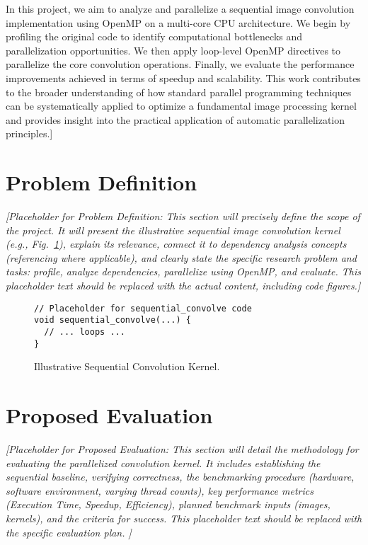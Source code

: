 \documentclass[conference, 10pt]{IEEEtran}
\begin{document}
{{In this project, we aim to analyze and parallelize a sequential image convolution implementation using OpenMP on a multi-core CPU architecture. We begin by profiling the original code to identify computational bottlenecks and parallelization opportunities. We then apply loop-level OpenMP directives to parallelize the core convolution operations. Finally, we evaluate the performance improvements achieved in terms of speedup and scalability. This work contributes to the broader understanding of how standard parallel programming techniques can be systematically applied to optimize a fundamental image processing kernel and provides insight into the practical application of automatic parallelization principles.]
}}

\section{Problem Definition}
\textit{{\color{blue} %
[Placeholder for Problem Definition: This section will precisely define the scope of the project. It will present the illustrative sequential image convolution kernel (e.g., Fig.~\ref{fig:seq_code}), explain its relevance, connect it to dependency analysis concepts (referencing \cite{idkfactchecking2025} where applicable), and clearly state the specific research problem and tasks: profile, analyze dependencies, parallelize using OpenMP, and evaluate. This placeholder text should be replaced with the actual content, including code figures.]
}}

\begin{figure}[htbp]
\begin{verbatim}
// Placeholder for sequential_convolve code
void sequential_convolve(...) {
  // ... loops ...
}
\end{verbatim}
\caption{Illustrative Sequential Convolution Kernel.}
\label{fig:seq_code}
\end{figure}


\section{Proposed Evaluation}
\textit{{\color{blue} %
[Placeholder for Proposed Evaluation: This section will detail the methodology for evaluating the parallelized convolution kernel. It includes establishing the sequential baseline, verifying correctness, the benchmarking procedure (hardware, software environment, varying thread counts), key performance metrics (Execution Time, Speedup, Efficiency), planned benchmark inputs (images, kernels), and the criteria for success. This placeholder text should be replaced with the specific evaluation plan.
\cite{hbdscientific2025}]
}}
\end{document}
